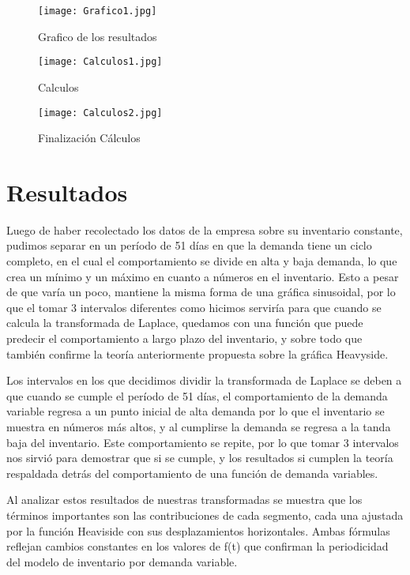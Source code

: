 \documentclass[12pt]{article}
\begin{document}
\begin{figure}
    \centering
    \texttt{[image: Grafico1.jpg]}
    \caption{Grafico de los resultados}
    \label{fig:enter-label}
\end{figure}
\begin{figure}
    \centering
    \texttt{[image: Calculos1.jpg]}
    \caption{Calculos}
    \label{fig:enter-label}
\end{figure}
\begin{figure}
    \centering
    \texttt{[image: Calculos2.jpg]}
    \caption{Finalización Cálculos}
    \label{fig:enter-label}
\end{figure}
\section*{Resultados}
Luego de haber recolectado los datos de la empresa sobre su inventario constante, pudimos separar en un período de 51 días en que la demanda tiene un ciclo completo, en el cual el comportamiento se divide en alta y baja demanda, lo que crea un mínimo y un máximo en cuanto a números en el inventario. Esto a pesar de que varía un poco, mantiene la misma forma de una gráfica sinusoidal, por lo que el tomar 3 intervalos diferentes como hicimos serviría para que cuando se calcula la transformada de Laplace, quedamos con una función que puede predecir el comportamiento a largo plazo del inventario, y sobre todo que también confirme la teoría anteriormente propuesta sobre la gráfica Heavyside.

Los intervalos en los que decidimos dividir la transformada de Laplace se deben a que cuando se cumple el período de 51 días, el comportamiento de la demanda variable regresa a un punto inicial de alta demanda por lo que el inventario se muestra en números más altos, y al cumplirse la demanda se regresa a la tanda baja del inventario. Este comportamiento se repite, por lo que tomar 3 intervalos nos sirvió para demostrar que si se cumple, y los resultados si cumplen la teoría respaldada detrás del comportamiento de una función de demanda variables.

Al analizar estos resultados de nuestras transformadas se muestra que los términos importantes son las contribuciones de cada segmento, cada una ajustada por la función Heaviside con sus desplazamientos horizontales. Ambas fórmulas reflejan cambios constantes en los valores de f(t) que confirman la periodicidad del modelo de inventario por demanda variable.
\end{document}
